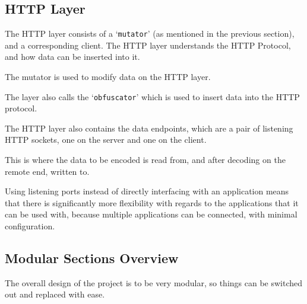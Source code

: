 \subsection{HTTP Layer}
The HTTP layer consists of a `\texttt{mutator}' (as mentioned in the previous section), and a corresponding client. The HTTP layer understands the HTTP Protocol, and how data can be inserted into it.\par
The mutator is used to modify data on the HTTP layer.\par
The layer also calls the `\texttt{obfuscator}' which is used to insert data into the HTTP protocol.\par
The HTTP layer also contains the data endpoints, which are a pair of listening HTTP sockets, one on the server and one on the client.\par
This is where the data to be encoded is read from, and after decoding on the remote end, written to.
\begin{center}
\end{center}
Using listening ports instead of directly interfacing with an application means that there is significantly more flexibility with regards to the applications that it can be used with, because multiple applications can be connected, with minimal configuration.

\subsection{Modular Sections Overview}
The overall design of the project is to be very modular, so things can be switched out and replaced with ease.

